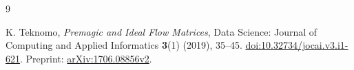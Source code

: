 \documentclass[11pt]{article}
\begin{document}
\begin{thebibliography}{9}
\raggedright
{} K. Teknomo, \emph{Premagic and Ideal Flow Matrices},
Data Science: Journal of Computing and Applied Informatics
\textbf{3}(1) (2019), 35--45.
\href{https://doi.org/10.32734/jocai.v3.i1-621}{doi:10.32734/jocai.v3.i1-621}.
Preprint: \href{https://arxiv.org/abs/1706.08856}{arXiv:1706.08856v2}.
\end{thebibliography}
\end{document}
